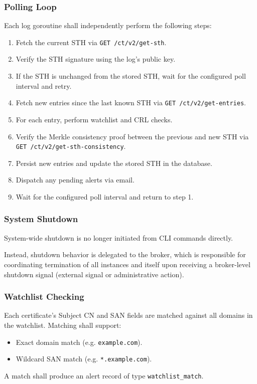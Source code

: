 \documentclass{article}
\begin{document}
\subsubsection{Polling Loop}
Each log goroutine shall independently perform the following steps:
\begin{enumerate}
    \item Fetch the current STH via \texttt{GET /ct/v2/get-sth}.
    \item Verify the STH signature using the log's public key.
    \item If the STH is unchanged from the stored STH, wait for the
    configured poll interval and retry.
    \item Fetch new entries since the last known STH via
    \texttt{GET /ct/v2/get-entries}.
    \item For each entry, perform watchlist and CRL checks.
    \item Verify the Merkle consistency proof between the previous and new
    STH via \texttt{GET /ct/v2/get-sth-consistency}.
    \item Persist new entries and update the stored STH in the database.
    \item Dispatch any pending alerts via email.
    \item Wait for the configured poll interval and return to step 1.
\end{enumerate}

\subsubsection{System Shutdown}

System-wide shutdown is no longer initiated from CLI commands directly.

Instead, shutdown behavior is delegated to the broker, which is responsible
for coordinating termination of all instances and itself upon receiving a
broker-level shutdown signal (external signal or administrative action).

\subsubsection{Watchlist Checking}
Each certificate's Subject CN and SAN fields are matched against all domains
in the watchlist. Matching shall support:
\begin{itemize}
    \item Exact domain match (e.g. \texttt{example.com}).
    \item Wildcard SAN match (e.g. \texttt{*.example.com}).
\end{itemize}
A match shall produce an alert record of type \texttt{watchlist\_match}.
\end{document}
